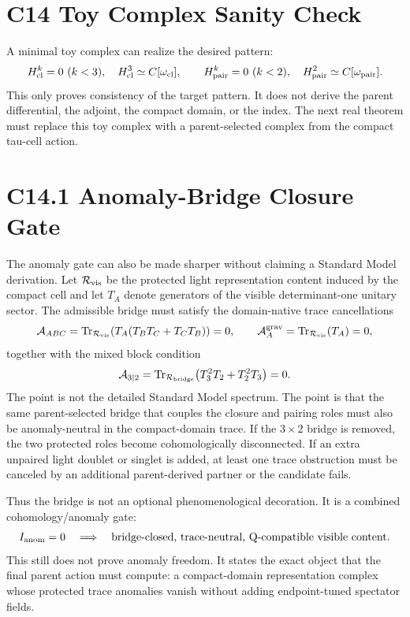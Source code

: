 \documentclass[11pt]{article}
\begin{document}
\section{C14 Toy Complex Sanity Check}
A minimal toy complex can realize the desired pattern:
\begin{equation}
H^k_{\rm cl}=0\ (k<3),\quad H^3_{\rm cl}\simeq C[\omega_{\rm cl}],
\qquad
H^k_{\rm pair}=0\ (k<2),\quad H^2_{\rm pair}\simeq C[\omega_{\rm pair}].
\end{equation}
This only proves consistency of the target pattern.  It does not derive the
parent differential, the adjoint, the compact domain, or the index.  The next
real theorem must replace this toy complex with a parent-selected complex from
the compact tau-cell action.

\section{C14.1 Anomaly-Bridge Closure Gate}
The anomaly gate can also be made sharper without claiming a Standard Model
derivation.  Let ${\cal R}_{\rm vis}$ be the protected light representation
content induced by the compact cell and let $T_A$ denote generators of the
visible determinant-one unitary sector.  The admissible bridge must satisfy the
domain-native trace cancellations
\begin{equation}
{\cal A}_{ABC}
=\operatorname{Tr}_{{\cal R}_{\rm vis}}
\!\left(T_A(T_BT_C+T_CT_B)\right)=0,
\qquad
{\cal A}_A^{\rm grav}
=\operatorname{Tr}_{{\cal R}_{\rm vis}}(T_A)=0,
\end{equation}
together with the mixed block condition
\begin{equation}
{\cal A}_{3|2}
=\operatorname{Tr}_{{\cal R}_{\rm bridge}}
\!\left(T_3^2T_2+T_2^2T_3\right)=0 .
\end{equation}
The point is not the detailed Standard Model spectrum.  The point is that the
same parent-selected bridge that couples the closure and pairing roles must also
be anomaly-neutral in the compact-domain trace.  If the $3\times2$ bridge is
removed, the two protected roles become cohomologically disconnected.  If an
extra unpaired light doublet or singlet is added, at least one trace obstruction
must be canceled by an additional parent-derived partner or the candidate fails.

Thus the bridge is not an optional phenomenological decoration.  It is a
combined cohomology/anomaly gate:
\begin{equation}
I_{\rm anom}=0
\quad\Longrightarrow\quad
\text{bridge-closed, trace-neutral, Q-compatible visible content} .
\end{equation}
This still does not prove anomaly freedom.  It states the exact object that the
final parent action must compute: a compact-domain representation complex whose
protected trace anomalies vanish without adding endpoint-tuned spectator fields.
\end{document}
